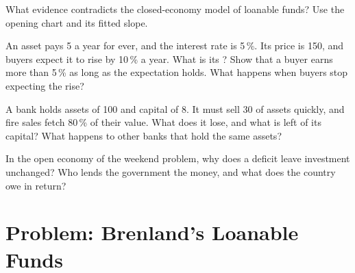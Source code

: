\begin{exercise}[$\star\star\star$]\label{exo:g12:saving-and-investment:12}
What evidence contradicts the closed-economy model of loanable funds? Use the opening chart and its fitted slope.
\end{exercise}

\begin{exercise}[$\star\star\star$]\label{exo:g12:saving-and-investment:13}
An asset pays 5 a year for ever, and the interest rate is 5\,\%. Its price is 150, and buyers expect it to rise by 10\,\% a year. What is its ? Show that a buyer
earns more than 5\,\% as long as the expectation holds. What happens when buyers stop expecting the rise?
\end{exercise}

\begin{exercise}[$\star\star\star$]\label{exo:g12:saving-and-investment:14}
A bank holds assets of 100 and capital of 8. It must sell 30 of assets quickly, and fire sales fetch 80\,\% of their value. What does it lose, and what is left of its
capital? What happens to other banks that hold the same assets?
\end{exercise}

\begin{exercise}[$\star\star\star$]\label{exo:g12:saving-and-investment:15}
In the open economy of the weekend problem, why does a deficit leave investment unchanged? Who lends the government the money, and what does the country owe in return?
\end{exercise}

\section{Problem: Brenland's Loanable Funds}

